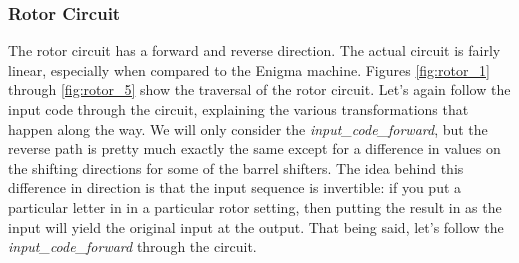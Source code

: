 \documentclass{article}
\begin{document}
\subsubsection{Rotor Circuit}
The rotor circuit has a forward and reverse direction. The actual circuit is fairly linear, especially when compared to the Enigma machine. Figures \ref{fig:rotor_1} through \ref{fig:rotor_5} show the traversal of the rotor circuit. Let's again follow the input code through the circuit, explaining the various transformations that happen along the way. We will only consider the \textit{input\_code\_forward}, but the reverse path is pretty much exactly the same except for a difference in values on the shifting directions for some of the barrel shifters. The idea behind this difference in direction is that the input sequence is invertible: if you put a particular letter in in a particular rotor setting, then putting the result in as the input will yield the original input at the output. That being said, let's follow the \textit{input\_code\_forward} through the circuit. 
\end{document}
